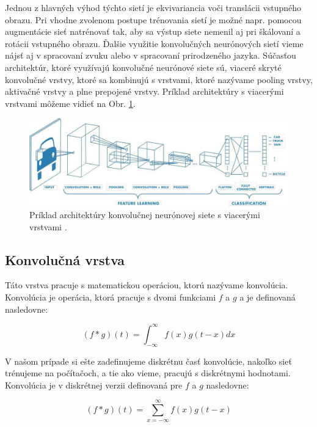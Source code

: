 Jednou z hlavných výhod týchto sietí je ekvivariancia voči translácii vstupného
obrazu. Pri vhodne zvolenom postupe trénovania sietí je možné napr. pomocou augmentácie sieť natrénovať tak, aby sa výstup siete nemenil aj pri škálovaní a rotácii
vstupného obrazu. Ďalšie využitie konvolučných neurónových sietí vieme nájsť aj v
spracovaní zvuku alebo v spracovaní prirodzeného jazyka.
Súčasťou architektúr, ktoré využívajú konvolučné neurónové siete sú,
viaceré skryté konvolučné vrstvy, ktoré sa kombinujú s vrstvami, ktoré nazývame pooling vrstvy, aktivačné vrstvy a plne prepojené vrstvy. Príklad architektúry s viacerými
vrstvami môžeme vidieť na Obr. \ref{fig:conv_multi_layer}.

\begin{figure}[H]
\centerline{\includegraphics[width=1\textwidth]{images/conv multi layer.jpg}}
\caption{Príklad architektúry konvolučnej neurónovej siete s viacerými vrstvami \cite{convnn}.}
\label{fig:conv_multi_layer}
\end{figure}

\subsection{Konvolučná vrstva}

Táto vrstva pracuje s matematickou operáciou, ktorú nazývame konvolúcia. Konvolúcia je operácia, ktorá pracuje s dvomi funkciami $f$ a $g$ a je definovaná nasledovne:

\begin{equation}
(f * g)(t) = \int_{-\infty}^{\infty} f(x)g(t - x) dx
\end{equation}

V našom prípade si ešte zadefinujeme diskrétnu časť konvolúcie, nakoľko sieť trénujeme
na počítačoch, a tie ako vieme, pracujú s diskrétnymi hodnotami. Konvolúcia je v
diskrétnej verzii definovaná pre $f$ a $g$ nasledovne:

\begin{equation}
(f * g)(t) = \sum_{x=-\infty}^{\infty} f(x)g(t - x)
\end{equation}

